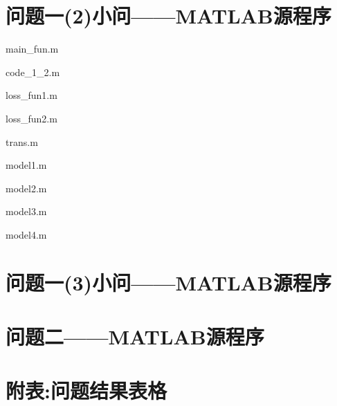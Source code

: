\documentclass[withoutpreface,bwprint]{cumcmthesis}
\begin{document}
\begin{appendices}
		\section{问题一(2)小问——MATLAB源程序}
		main\_fun.m
		
		code\_1\_2.m
		
		loss\_fun1.m
		
		loss\_fun2.m
		
		trans.m
		
		model1.m
		
		model2.m
		
		model3.m
		
		model4.m
		
		\section{问题一(3)小问——MATLAB源程序}
		
		\section{问题二——MATLAB源程序}	
		\section{附表:问题结果表格}
		

\end{appendices}
\end{document}
